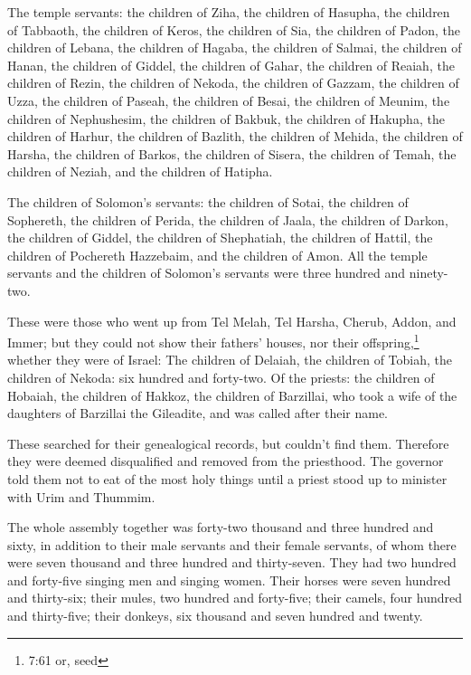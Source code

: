  The temple servants: the children of Ziha, the children of
Hasupha, the children of Tabbaoth,  the children of Keros,
the children of Sia, the children of Padon,  the children
of Lebana, the children of Hagaba, the children of Salmai, 
the children of Hanan, the children of Giddel, the children of Gahar,
 the children of Reaiah, the children of Rezin, the
children of Nekoda,  the children of Gazzam, the children
of Uzza, the children of Paseah,  the children of Besai,
the children of Meunim, the children of Nephushesim,  the
children of Bakbuk, the children of Hakupha, the children of Harhur,
 the children of Bazlith, the children of Mehida, the
children of Harsha,  the children of Barkos, the children
of Sisera, the children of Temah,  the children of Neziah,
and the children of Hatipha.

 The children of Solomon's servants: the children of Sotai,
the children of Sophereth, the children of Perida,  the
children of Jaala, the children of Darkon, the children of Giddel,
 the children of Shephatiah, the children of Hattil, the
children of Pochereth Hazzebaim, and the children of Amon. 
All the temple servants and the children of Solomon's servants were
three hundred and ninety-two.

 These were those who went up from Tel Melah, Tel Harsha,
Cherub, Addon, and Immer; but they could not show their fathers' houses,
nor their offspring,\footnote{7:61 or, seed} whether they were of
Israel:  The children of Delaiah, the children of Tobiah,
the children of Nekoda: six hundred and forty-two.  Of the
priests: the children of Hobaiah, the children of Hakkoz, the children
of Barzillai, who took a wife of the daughters of Barzillai the
Gileadite, and was called after their name.

 These searched for their genealogical records, but
couldn't find them. Therefore they were deemed disqualified and removed
from the priesthood.  The governor told them not to eat of
the most holy things until a priest stood up to minister with Urim and
Thummim.

 The whole assembly together was forty-two thousand and
three hundred and sixty,  in addition to their male
servants and their female servants, of whom there were seven thousand
and three hundred and thirty-seven. They had two hundred and forty-five
singing men and singing women.  Their horses were seven
hundred and thirty-six; their mules, two hundred and forty-five;
 their camels, four hundred and thirty-five; their donkeys,
six thousand and seven hundred and twenty.

